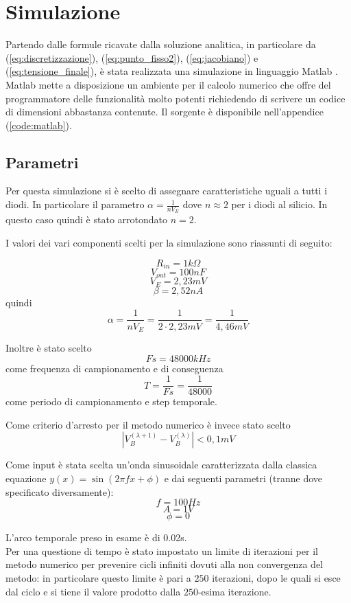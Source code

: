 \chapter{Simulazione}
	Partendo dalle formule ricavate dalla soluzione analitica, in particolare da (\ref{eq:discretizzazione}), (\ref{eq:punto_fisso2}), (\ref{eq:jacobiano}) e (\ref{eq:tensione_finale}), è stata realizzata una simulazione in linguaggio Matlab \cite{matlab, matlab_book}. Matlab mette a disposizione un ambiente per il calcolo numerico che offre del programmatore delle funzionalità molto potenti richiedendo di scrivere un codice di dimensioni abbastanza contenute. Il sorgente è disponibile nell'appendice (\ref{code:matlab}).
	
	\section{Parametri}
		Per questa simulazione si è scelto di assegnare caratteristiche uguali a tutti i diodi. In particolare il parametro $\alpha = \frac{1}{nV_{E}}$ dove $n \approx 2$ per i diodi al silicio. In questo caso quindi è stato arrotondato $n = 2$.
	
		I valori dei vari componenti scelti per la simulazione sono riassunti di seguito:
	
		\[
			R_{in} = 1k\Omega
		\]
		\[
			V_{out} = 100nF
		\]
		\[
			V_{E} = 2,23mV
		\]
		\[
			\beta = 2,52nA
		\]
		quindi
		\[
			\alpha = \frac{1}{nV_{E}} = \frac{1}{2 \cdot 2,23mV} = \frac{1}{4,46mV}
		\]
	
		Inoltre è stato scelto
		\[
			Fs = 48000kHz
		\]
		come frequenza di campionamento e di conseguenza
		\[
			T = \frac{1}{Fs} = \frac{1}{48000}
		\]
		come periodo di campionamento e step temporale.
		
		Come criterio d'arresto per il metodo numerico è invece stato scelto
		\[
			|V_{B}^{(\lambda+1)} - V_{B}^{(\lambda)}| < 0,1mV
		\]
	
		Come input è stata scelta un'onda sinusoidale caratterizzata dalla classica equazione $y(x) = \sin (2 \pi f x + \phi)$ e dai seguenti parametri (tranne dove specificato diversamente):
		\[
			f = 100Hz
		\]
		\[
			A = 1V
		\]
		\[
			\phi = 0
		\]
		
		\vspace{10px}
		L'arco temporale preso in esame è di 0.02s.\\
		
		Per una questione di tempo è stato impostato un limite di iterazioni per il metodo numerico per prevenire cicli infiniti dovuti alla non convergenza del metodo: in particolare questo limite è pari a $250$ iterazioni, dopo le quali si esce dal ciclo e si tiene il valore prodotto dalla $250$-esima iterazione.
	\pagebreak
	

